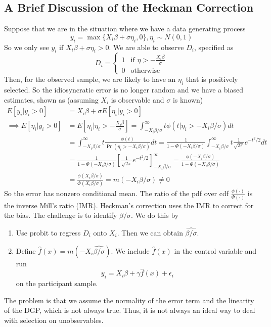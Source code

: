 \documentclass[12pt]{article}
\theoremstyle{definition}
\theoremstyle{property}
\theoremstyle{assumption}
\theoremstyle{example}
\theoremstyle{comment}
\begin{document}
\subsection{A Brief Discussion of the Heckman Correction}
Suppose that we are in the situation where we have a data generating process
\[
y_i = \max\{X_i\beta+\sigma\eta_i, 0\}, \eta_i \sim N(0,1)
\]
So we only see $y_i$ if $X_i\beta+\sigma\eta_i>0$. We are able to observe $D_i$, specified as
\[
D_i=\begin{cases}1 & \text{if }\eta>-\frac{X_i\beta}{\sigma}\\ 0 & \text{otherwise} \end{cases}
\]
Then, for the observed sample, we are likely to have an $\eta_i$ that is positively selected. So the idiosyncratic error is no longer random and we have a biased estimates, shown as (assuming $X_i$ is observable and $\sigma$ is known)
\footnotesize{\begin{align*}
E[y_i|y_i>0]&= X_i\beta +\sigma E[\eta_i|y_i>0]\\
\implies E[\eta_i|y_i>0]& =E\left[\eta_i| \eta_i>-\frac{X_i\beta}{\sigma}\right]=\int_{-X_i\beta/\sigma}^\infty t\phi(t|\eta_i>-X_i\beta/\sigma)dt\\
&=\int_{-X_i\beta/\sigma}^\infty t\frac{\phi(t)}{\Pr(\eta_i>-X_i\beta/\sigma)}dt =\frac{1}{1-\Phi(-X_i\beta/\sigma)}\int_{-X_i\beta/\sigma}^\infty t\frac{1}{\sqrt{2\pi}}e^{-t^2/2}dt\\
&=\frac{1}{1-\Phi(-X_i\beta/\sigma)}\left[\frac{1}{\sqrt{2\pi}}e^{-t^2/2}\right]_{-X_i\beta/\sigma}^\infty=\frac{\phi(-X_i\beta/\sigma)}{1-\Phi(-X_i\beta/\sigma)}\\
&=\frac{\phi(X_i\beta/\sigma)}{\Phi(X_i\beta/\sigma)}=m(-X_i\beta/\sigma)\neq0
\end{align*}}\normalsize
So the error has nonzero conditional mean. The ratio of the pdf over cdf $\frac{\phi(\cdot)}{\Phi(\cdot)}$ is the inverse Mill's ratio (IMR). Heckman's correction uses the IMR to correct for the bias. The challenge is to identify $\beta/\sigma$. We do this by
\begin{enumerate}
\item Use probit to regress $D_i$ onto $X_i$. Then we can obtain $\widehat{\beta/\sigma}$.
\item Define $\hat{f}(x)=m(-X_i\widehat{\beta/\sigma})$. We include $\hat{f}(x)$ in the control variable and run
\[
y_i = X_i\beta+ \gamma\hat{f}(x)+\epsilon_i
\]
on the participant sample. 
\end{enumerate}\par
The problem is that we assume the normality of the error term and the linearity of the DGP, which is not always true. Thus, it is not always an ideal way to deal with selection on unobservables. 
\end{document}
